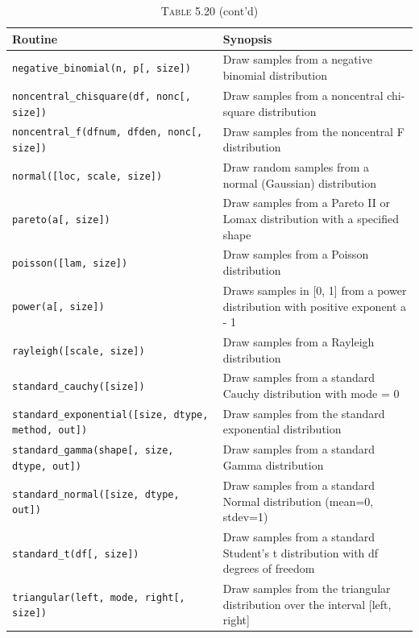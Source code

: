 \documentclass[a4paper,11pt]{book}
\begin{document}
\begin{table}
	\centering
	\caption*{\textsc{Table 5.20} (cont'd)} 
	\begin{tabular}{lp{12cm}}
		\toprule \toprule
			Routine & Synopsis \\
			\midrule
\texttt{negative\_binomial(n, p[, size])} &
                        Draw samples from a negative binomial distribution\\
\texttt{noncentral\_chisquare(df, nonc[, size])} &
                        Draw samples from a noncentral chi-square distribution\\
\texttt{noncentral\_f(dfnum, dfden, nonc[, size])} &
                        Draw samples from the noncentral F distribution\\
\texttt{normal([loc, scale, size])} &
                        Draw random samples from a normal (Gaussian) distribution\\
\texttt{pareto(a[, size])} &
                        Draw samples from a Pareto II or Lomax distribution with a specified shape\\
\texttt{poisson([lam, size])} &
                        Draw samples from a Poisson distribution\\
\texttt{power(a[, size])} &
                        Draws samples in [0, 1] from a power distribution with positive exponent a - 1\\
\texttt{rayleigh([scale, size])} &
                        Draw samples from a Rayleigh distribution\\
\texttt{standard\_cauchy([size])} &
                        Draw samples from a standard Cauchy distribution with mode = 0\\
\texttt{standard\_exponential([size, dtype, method, out])} &
                        Draw samples from the standard exponential distribution\\
\texttt{standard\_gamma(shape[, size, dtype, out])} &
                        Draw samples from a standard Gamma distribution\\
\texttt{standard\_normal([size, dtype, out])} &
                        Draw samples from a standard Normal distribution (mean=0, stdev=1)\\
\texttt{standard\_t(df[, size])} &
                        Draw samples from a standard Student's t distribution with df degrees of freedom\\
\texttt{triangular(left, mode, right[, size])} &
                        Draw samples from the triangular distribution over the interval [left, right]\\

\end{tabular}
\end{table}
\end{document}
